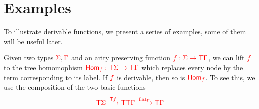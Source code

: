 
\section{Examples}\label{sec:AppendixExamples}

%
%
%    
%
To illustrate derivable functions, we present a series of examples, some of them will be useful later.


\noindent \begin{example}\label{ex:morphism} 
Given two types ${\color{red}{\Sigma}}, {\color{red}{\Gamma}}$ and an arity preserving  function ${\color{red}{f:\Sigma\to{\color{red}{\mathsf T}}\Gamma}}$, we can lift ${\color{red}{f}}$ to the tree homomophism  ${\color{red}{\mathsf{Hom}_f:{\color{red}{\mathsf T}}\Sigma\to {\color{red}{\mathsf T}}\Gamma}}$ which replaces every node by the term corresponding to its label. If ${\color{red}{f}}$ is derivable, then so is  ${\color{red}{\mathsf{Hom}_f}}$. To see this, we use the composition of the two basic functions
\begin{align*}
{\color{red}{{\color{red}{\mathsf T}}\Sigma\xrightarrow{{\color{red}{\mathsf T}}f}{\color{red}{\mathsf T}}{\color{red}{\mathsf T}}\Gamma \xrightarrow{{\color{red}{\mathrm{flat}}}_\Gamma} {\color{red}{\mathsf T}}\Gamma}}
\end{align*}
\end{example}

